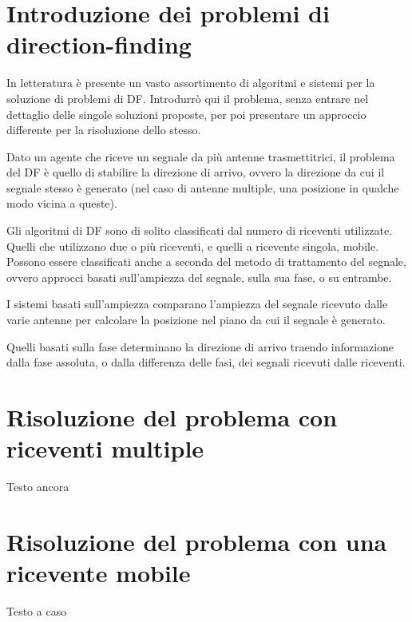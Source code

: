 \section{Introduzione dei problemi di direction-finding}

In letteratura è presente un vasto assortimento di algoritmi e sistemi per la soluzione di problemi di DF. Introdurrò qui il problema,
senza entrare nel dettaglio delle singole soluzioni proposte, per poi presentare un approccio differente per la risoluzione dello stesso.

Dato un agente che riceve un segnale da più antenne trasmettitrici, il problema del DF è quello di stabilire la direzione di arrivo,
ovvero la direzione da cui il segnale stesso è generato (nel caso di antenne multiple, una posizione in qualche modo vicina a queste).

Gli algoritmi di DF sono di solito classificati dal numero di riceventi utilizzate. Quelli che utilizzano due o più riceventi, e quelli
a ricevente singola, mobile. Possono essere classificati anche a seconda del metodo di trattamento del segnale, ovvero approcci basati
sull'ampiezza del segnale, sulla sua fase, o su entrambe. 

I sistemi basati sull'ampiezza comparano l'ampiezza del segnale ricevuto dalle varie antenne per calcolare la posizione nel piano da cui
il segnale è generato.

Quelli basati sulla fase determinano la direzione di arrivo traendo informazione dalla fase assoluta, o dalla differenza delle fasi, dei 
segnali ricevuti dalle riceventi.

\section{Risoluzione del problema con riceventi multiple}
Testo ancora

\section{Risoluzione del problema con una ricevente mobile}
Testo a caso